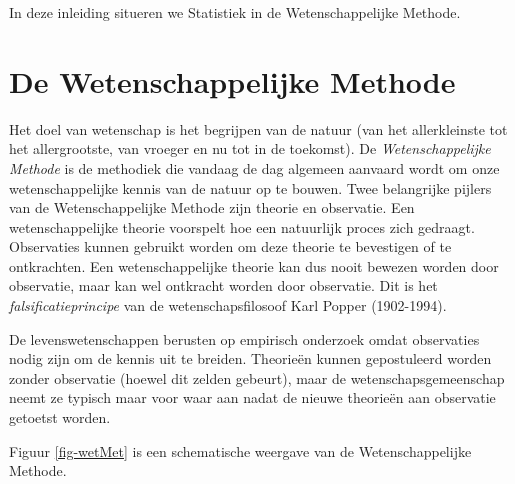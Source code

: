 \documentclass[
  dutch,
  letterpaper,
  12pt]{book}
\theoremstyle{definition}
\theoremstyle{definition}
\theoremstyle{definition}
\theoremstyle{remark}
\begin{document}
In deze inleiding situeren we Statistiek in de Wetenschappelijke
Methode.

\section{De Wetenschappelijke Methode}\label{sec-wetMeth}

Het doel van wetenschap is het begrijpen van de natuur (van het
allerkleinste tot het allergrootste, van vroeger en nu tot in de
toekomst). De \emph{Wetenschappelijke Methode} is de methodiek die
vandaag de dag algemeen aanvaard wordt om onze wetenschappelijke kennis
van de natuur op te bouwen. Twee belangrijke pijlers van de
Wetenschappelijke Methode zijn theorie en observatie. Een
wetenschappelijke theorie voorspelt hoe een natuurlijk proces zich
gedraagt. Observaties kunnen gebruikt worden om deze theorie te
bevestigen of te ontkrachten. Een wetenschappelijke theorie kan dus
nooit bewezen worden door observatie, maar kan wel ontkracht worden door
observatie. Dit is het \emph{falsificatieprincipe} van de
wetenschapsfilosoof Karl Popper (1902-1994).

De levenswetenschappen berusten op empirisch onderzoek omdat observaties
nodig zijn om de kennis uit te breiden. Theorieën kunnen gepostuleerd
worden zonder observatie (hoewel dit zelden gebeurt), maar de
wetenschapsgemeenschap neemt ze typisch maar voor waar aan nadat de
nieuwe theorieën aan observatie getoetst worden.

Figuur \ref{fig-wetMet} is een schematische weergave van de
Wetenschappelijke Methode.
\end{document}
